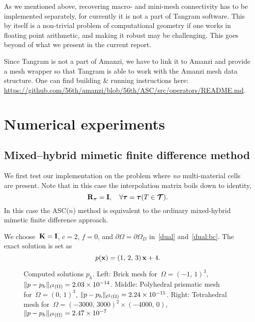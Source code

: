 \begin{remark}
As we mentioned above, recovering macro- and mini-mesh connectivity has to be implemented separately, for currently it is not a part of Tangram software. This by itself is a non-trivial problem of computational geometry if one works in floating point arithmetic, and making it robust may be challenging. This goes beyond of what we present in the current report.
\end{remark}

Since Tangram is not a part of Amanzi, we have to link it to Amanzi and provide a mesh wrapper so that Tangram is able to work with the Amanzi mesh data structure. One can find building \& running instructions here: \url{https://github.com/56th/amanzi/blob/56th/ASC/src/operators/README.md}.

\section{Numerical experiments}

\subsection{Mixed--hybrid mimetic finite difference method}

We first test our implementation on the problem where \textit{no} multi-material cells are present. Note that in this case the interpolation matrix boils down to identity,
\begin{equation}
	\boldsymbol{\mathbf{R}}_{{\boldsymbol{\mathbf{\mathcal \tau}}}} = \boldsymbol{\mathbf{I}}, \quad \forall {\boldsymbol{\mathbf{\mathcal \tau}}} = {\boldsymbol{\mathbf{\mathcal \tau}}}(T \in {\boldsymbol{\mathbf{\mathcal T}}}).
\end{equation}
In this case the ASC($n$) method is equivalent to the ordinary mixed-hybrid mimetic finite difference\footnotemark{} approach.

We choose~$\boldsymbol{\mathbf{K}} = \boldsymbol{\mathbf{I}}$, $c = 2$, $f = 0$, and $\partial\Omega = \partial\Omega_D$ in~\eqref{dual} and~\eqref{dual:bc}. The exact solution is set as
\begin{equation}\label{exact1}
	p(\boldsymbol{\mathbf{x}}) = (1,\,2,\,3)\,\boldsymbol{\mathbf{x}} + 4.
\end{equation}

\begin{figure}[H]
	\centering
	\begin{subfigure}{.33\linewidth}
		\centering
	\end{subfigure}%
	\begin{subfigure}{.33\linewidth}
		\centering
	\end{subfigure}%
	\begin{subfigure}{.33\linewidth}
		\centering
	\end{subfigure}%
	\caption{Computed solutions $p_h$. Left: Brick mesh for~$\Omega = (-1,\,1)^3$, $\|p - p_h\|_{{\ell^2\left({\Omega}\right)}} = 2.03\times 10^{-14}$. Middle: Polyhedral prismatic mesh for~$\Omega = (0,\,1)^3$, $\|p - p_h\|_{{\ell^2\left({\Omega}\right)}} = 2.24\times 10^{-15}$. Right: Tetrahedral mesh for~$\Omega = (-3000,\,3000)^2\times(-4000,\,0)$, $\|p - p_h\|_{{\ell^2\left({\Omega}\right)}} = 2.47\times 10^{-7}$}
	\label{fig:exact1}		
\end{figure}

